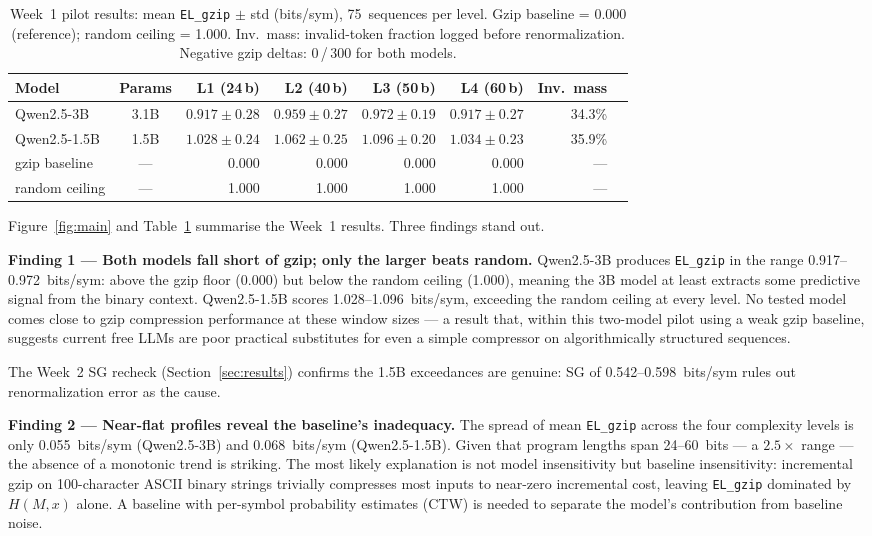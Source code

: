 \documentclass{article}
\begin{document}
\begin{table}[h]
\centering
\caption{%
  Week~1 pilot results: mean \texttt{EL\_gzip} $\pm$ std (bits/sym),
  75~sequences per level.
  Gzip baseline = 0.000 (reference); random ceiling = 1.000.
  Inv.\ mass: invalid-token fraction logged before renormalization.
  Negative gzip deltas: 0\,/\,300 for both models.%
}
\label{tab:results}
\vspace{4pt}
\small
\begin{tabular}{lcrrrrrr}
\toprule
Model & Params
  & L1 (24\,b) & L2 (40\,b)
  & L3 (50\,b) & L4 (60\,b) & Inv.\ mass \\
\midrule
Qwen2.5-3B   & 3.1B
  & $0.917{\pm}0.28$ & $0.959{\pm}0.27$
  & $0.972{\pm}0.19$ & $0.917{\pm}0.27$ & 34.3\% \\
Qwen2.5-1.5B & 1.5B
  & $1.028{\pm}0.24$ & $1.062{\pm}0.25$
  & $1.096{\pm}0.20$ & $1.034{\pm}0.23$ & 35.9\% \\
\midrule
gzip baseline  & ---
  & 0.000 & 0.000 & 0.000 & 0.000 & --- \\
random ceiling & ---
  & 1.000 & 1.000 & 1.000 & 1.000 & --- \\
\bottomrule
\end{tabular}
\end{table}

Figure~\ref{fig:main} and Table~\ref{tab:results} summarise the Week~1
results. Three findings stand out.

\textbf{Finding 1 — Both models fall short of gzip; only the larger beats random.}
Qwen2.5-3B produces \texttt{EL\_gzip} in the range 0.917--0.972~bits/sym:
above the gzip floor (0.000) but below the random ceiling (1.000), meaning
the 3B model at least extracts some predictive signal from the binary context.
Qwen2.5-1.5B scores 1.028--1.096~bits/sym, exceeding the random ceiling at
every level.
No tested model comes close to gzip compression performance at these
window sizes — a result that, within this two-model pilot using a weak
gzip baseline, suggests current free LLMs are poor practical substitutes
for even a simple compressor on algorithmically structured sequences.

The Week~2 SG recheck (Section~\ref{sec:results}) confirms the 1.5B
exceedances are genuine: SG of 0.542--0.598~bits/sym rules out
renormalization error as the cause.

\textbf{Finding 2 — Near-flat profiles reveal the baseline's inadequacy.}
The spread of mean \texttt{EL\_gzip} across the four complexity levels is
only 0.055~bits/sym (Qwen2.5-3B) and 0.068~bits/sym (Qwen2.5-1.5B).
Given that program lengths span 24--60~bits — a $2.5\times$ range — the
absence of a monotonic trend is striking.
The most likely explanation is not model insensitivity but baseline
insensitivity: incremental gzip on 100-character ASCII binary strings
trivially compresses most inputs to near-zero incremental cost, leaving
\texttt{EL\_gzip} dominated by $H(M, x)$ alone.
A baseline with per-symbol probability estimates (CTW) is needed to
separate the model's contribution from baseline noise.
\end{document}
